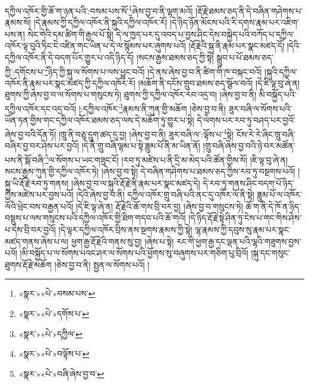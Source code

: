 དཀྱིལ་འཁོར་གྱི་ཆོ་ག་ཉན་པའི་:བསམ་པས་སོ་\footnote{«སྣར་»«པེ་»བསམ་པས་}ཞེས་བྱ་བ་ནི་ལྷག་མའོ། །རྡོ་རྗེ་ཐམས་ཅད་ནི་དེ་བཞིན་གཤེགས་པ་རྣམས་སོ། །དེ་རྣམས་ཀྱི་དཀྱིལ་འཁོར་ནི་སྐུའི་དཀྱིལ་འཁོར་རོ། །དེ་ཉིད་ཉོན་མོངས་པའི་རི་དགས་རྣམ་པར་འཇིག་པས་ན། སེང་གེའི་དམ་ཚིག་གི་རྒྱལ་པོ་སྟེ། དེ་ལ་ཁྱད་པར་དུ་འབད་པ་བྱས་ཤིང་དེས་བསྐྱེད་པའི་བཀོད་པ་དཀྱིལ་འཁོར་ལྟ་བུའི་ཏིང་ངེ་འཛིན་གང་ཡིན་པ་དེ་ལ་སྙོམས་པར་ཞུགས་པའོ། །རྡོ་རྗེའི་སྐུ་ནི་རྣམ་པར་སྣང་མཛད་དོ། །དེའི་དཀྱིལ་འཁོར་ནི་དེ་བདག་པོར་གྱུར་པ་འདི་ཉིད་དོ། །སངས་རྒྱས་ཐམས་ཅད་ཀྱི་སྟེ། སྒྲུབ་པ་པོ་ཐམས་ཅད་ཀྱི་:དགོངས་པ་\footnote{«སྣར་»«པེ་»དགོས་པ་}ཉིད་ཀྱི་སྐུ་ལ་སོགས་པ་ལས་ཕྱུང་བའོ། །དེ་ནས་ཞེས་བྱ་བ་ནི་ཚིག་གི་ཁ་བསྐང་བའོ། །སྐུའི་དཀྱིལ་འཁོར་ནི་རྣམ་པར་སྣང་མཛད་ཀྱི་དཀྱིལ་འཁོར་རོ། །མཆོག་ནི་དངོས་གྲུབ་ཐམས་ཅད་སྩོལ་བའོ། །དེ་ཇི་ལྟ་བུ་ཞེ་ན། ཐུགས་ཀྱི་ཞེས་བྱ་བ་ལ་སོགས་པ་གསུངས་ཏེ། ཐུགས་ཀྱི་དཀྱིལ་འཁོར་རབ་འདྲ་བ། །ཞེས་བྱ་བ་ནི། མི་བསྐྱོད་པའི་དཀྱིལ་འཁོར་དང་འདྲ་བའོ། །:དཀྱིལ་འཁོར་\footnote{«སྣར་»«པེ་»དཀྱིལ་}རྣམས་ནི་ཀུན་གྱི་མཆོག །ཅེས་བྱ་བ་ནི། ཟུར་བཞི་ལ་སོགས་པའི་ཡོན་ཏན་གྱིས་གང་དཀྱིལ་འཁོར་ཐམས་ཅད་ལས་དེ་མཆོག་ཏུ་གྱུར་པ་སྟེ། དེ་ལེགས་པར་རབ་ཏུ་བཤད་པར་བྱའོ་ཞེས་བྱ་བའི་དོན་ཏོ། །ཁྲུ་ནི་བཅུ་དྲུག་ཚད་དུ་བྱ། །ཞེས་བྱ་བ་ནི། ཟུར་བཞི་ལ་:ལྟོས་པ་\footnote{«སྣར་»«པེ་»བལྟོས་པ་}སྟེ། ངོས་རེ་རེ་ཞིང་ཁྲུ་བཞི་བཞིར་བྱ་བར་ཤེས་པར་བྱའོ། །དེ་ནི་གྲུ་བཞི་ལྷམ་པ་སྟེ་ཟླུམ་པོ་ནི་མ་ཡིན་ནོ། །གྲུ་བཞི་ཞེས་བྱ་བའི་ཉེ་བར་མཚོན་པས་ནི་སྒོ་བཞི་\footnote{«སྣར་»«པེ་»བཞི་ཞེས་བྱ་བ་}ལ་སོགས་པ་ཡང་གཟུང་ངོ། །རབ་ཏུ་མཛེས་པ་ནི་དྲི་མ་མེད་པའི་ཚོན་གྱིས་སོ། །ཇི་ལྟ་བུ་ཞེ་ན། སངས་རྒྱས་ཀུན་གྱི་དཀྱིལ་འཁོར་ཏེ། །ཞེས་བྱ་བ་སྟེ། དེ་བཞིན་གཤེགས་པ་ཐམས་ཅད་ཀྱིས་རབ་ཏུ་བསྔགས་པའོ། །སྐུ་ཡི་རྡོ་རྗེ་རབ་ཏུ་གནས། །ཞེས་བྱ་བ་ལ་སྐུའི་རྡོ་རྗེ་ནི་རྣམ་པར་སྣང་མཛད་དེ། དེ་རབ་ཏུ་གནས་ཤིང་བདག་པོ་ཉིད་ཀྱིས་མཛེས་པར་བྱས་པའོ། །དེའི་ཞེས་བྱ་བ་ནི། དཀྱིལ་འཁོར་གྲུ་བཞི་པའི་ནང་དུ་འཁོར་ལོ་ནི་སྟེ། ཟླུམ་པོ་ལ་འཁོར་ལོའི་ཕྲེང་བས་བརྒྱན་པའོ། །དེ་ཇི་ལྟ་ཞེ་ན། རྡོ་རྗེའི་ཆོ་གས་བྲི་བར་བྱ། །ཞེས་བྱ་བ་གསུངས་ཏེ། ཆོ་ག་ནི་དེ་ཁོ་ན་ཉིད་བསྡུས་པ་ལས་གསུངས་པའི་དཀྱིལ་འཁོར་གྱི་ཐིག་གདབ་པའི་ཆོ་གའོ། །དེ་ཉིད་རྡོ་རྗེ་སྟེ་ཤིན་ཏུ་ངེས་པ་གང་གིས་ཤེས་པ་དེས་བྲི་བར་བྱའོ། །དེ་ལྟར་དཀྱིལ་འཁོར་བྲིས་ནས་སྔགས་རྣམས་ཀྱི་སྟེ། ལྷ་རྣམས་ཀྱི་དབུས་སུ་རྣམ་པར་སྣང་མཛད་གནས་ཞེས་པ་ལ། ཕྱག་རྒྱ་རྡོ་རྗེའི་གནས་སུ་བྱ། །ཞེས་པ་སྟེ། རང་གི་ཕྱག་རྒྱ་དང་ལྡན་པའི་ལྷའི་གཟུགས་བྱས་པའོ། །མི་བསྐྱོད་པ་ལ་སོགས་པའང་ཤར་ལ་སོགས་པའི་ཕྱོགས་སུ་བཞུགས་པར་གཅིག་པུ་བྲིའོ། །སྐུ་དང་གསུང་ཐུགས་རྡོ་རྗེ་མཆོག །ཅེས་བྱ་བ་ནི། སྤྱན་ལ་སོགས་པའོ། །
